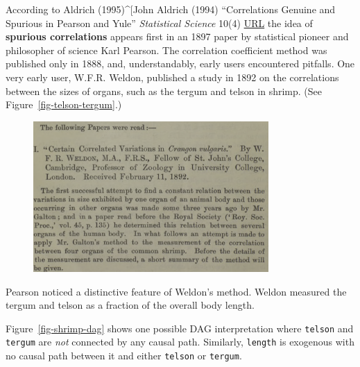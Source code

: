 \documentclass[
  letterpaper,
  DIV=11,
  numbers=noendperiod,
  oneside]{scrreprt}
\begin{document}
According to Aldrich (1995)\^{}{[}John Aldrich (1994) ``Correlations
Genuine and Spurious in Pearson and Yule'' \emph{Statistical Science}
10(4) \href{https://www.jstor.org/stable/2246135}{URL} the idea of
\textbf{spurious correlations} appears first in an 1897 paper by
statistical pioneer and philosopher of science Karl Pearson. The
correlation coefficient method was published only in 1888, and,
understandably, early users encountered pitfalls. One very early user,
W.F.R. Weldon, published a study in 1892 on the correlations between the
sizes of organs, such as the tergum and telson in shrimp. (See
Figure~\ref{fig-telson-tergum}.)

\begin{figure}

{\centering \includegraphics[width=0.8\textwidth,height=\textheight]{./www/shrimp-correlations.png}

}

\end{figure}

Pearson noticed a distinctive feature of Weldon's method. Weldon
measured the tergum and telson as a fraction of the overall body length.

Figure~\ref{fig-shrimp-dag} shows one possible DAG interpretation where
\texttt{telson} and \texttt{tergum} are \emph{not} connected by any
causal path. Similarly, \texttt{length} is exogenous with no causal path
between it and either \texttt{telson} or \texttt{tergum}.
\end{document}
